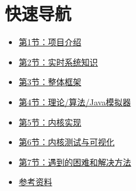 
\section*{快速导航}
\begin{itemize}
    \item \hyperref[sec:intro]{第1节：项目介绍}
    \item \hyperref[sec:realtime]{第2节：实时系统知识}
    \item \hyperref[sec:design]{第3节：整体框架}
    \item \hyperref[sec:theory]{第4节：理论/算法/Java模拟器}
    \item \hyperref[sec:kernel]{第5节：内核实现}
    \item \hyperref[sec:test]{第6节：内核测试与可视化}
    \item \hyperref[sec:difficulties_future]{第7节：遇到的困难和解决方法}
    \item \hyperref[sec:refs]{参考资料}
\end{itemize}
